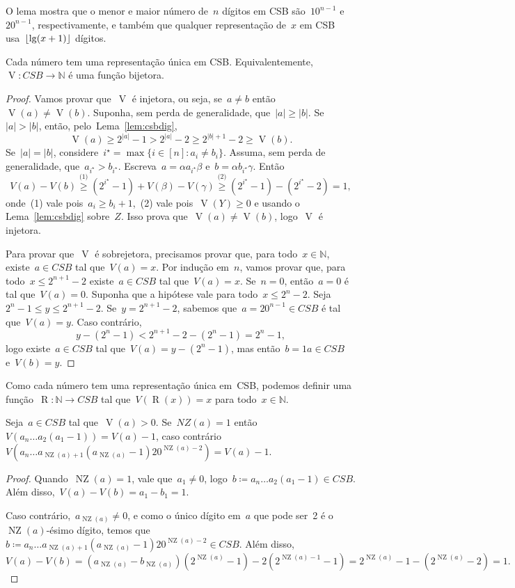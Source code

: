 \documentclass[main.tex]{subfiles}
\newcommand{\NZ}{\operatorname{NZ}}
\newcommand{\CSB}{\textit{CSB}}
\renewcommand{\V}{\operatorname{V}}
\newcommand{\R}{\operatorname{R}}
\begin{document}
O lema mostra que o menor e maior número de~$n$ dígitos em CSB são~$10^{n-1}$ e~$20^{n-1}$, respectivamente, e também que qualquer representação de~$x$ em CSB usa~$\lfloor\lg(x + 1)\rfloor$ dígitos.

\begin{theorem} \label{thm:csbbij}
	Cada número tem uma representação única em CSB. Equivalentemente,~${\V: \CSB \rightarrow \mathbb{N}}$ é uma função bijetora.
\end{theorem}
\begin{proof}
	Vamos provar que~$\V$ é injetora, ou seja, se~${a \neq b}$ então~${\V(a) \neq \V(b)}$. Suponha, sem perda de generalidade, que~$|a| \geq |b|$. Se~$|a| > |b|$, então, pelo~Lema~\ref{lem:csbdig},
	$$ \V(a) \geq 2^{|a|} - 1 > 2^{|a|} - 2 \geq 2^{|b| + 1} - 2 \geq \V(b). $$
	Se~$|a| = |b|$, considere~${i^\star = \max\{i \in [n] : a_i \neq b_i\}}$. Assuma, sem perda de generalidade, que~${a_{i^\star} > b_{i^\star}}$. Escreva~${a = \alpha a_{i^\star} \beta}$ e~${b = \alpha b_{i^\star} \gamma}$. Então
	$$ V(a) - V(b) \stackrel{\text{(1)}}{\geq} (2^{i^\star} - 1) + V(\beta) - V(\gamma) \stackrel{\text{(2)}}{\geq} (2^{i^\star} - 1) - (2^{i^\star} - 2) = 1, $$
	onde~(1) vale pois~$a_i \geq b_i + 1$,~(2) vale pois~$\V(Y) \geq 0$ e usando o Lema~\ref{lem:csbdig} sobre~$Z$. Isso prova que~$\V(a) \neq \V(b)$, logo~$\V$ é injetora.

	Para provar que~$\V$ é sobrejetora, precisamos provar que, para todo~$x \in \mathbb{N}$, existe~$a \in \CSB$ tal que~$V(a) = x$. Por indução em~$n$, vamos provar que, para todo~$x \leq 2^{n+1} - 2$ existe~$a \in \CSB$ tal que~$V(a) = x$. Se~$n = 0$, então~$a = 0$ é tal que~$V(a) = 0$. Suponha que a hipótese vale para todo~$x \leq 2^n - 2$. Seja~${2^n - 1 \leq y \leq 2^{n+1} - 2}$. Se~$y = 2^{n+1} - 2$, sabemos que~${a = 20^{n-1} \in \CSB}$ é tal que~$V(a) = y$. Caso contrário,~
	$$y - (2^n - 1) < 2^{n+1} - 2 - (2^n - 1) = 2^n - 1,$$
	logo existe~$a \in \CSB$ tal que~${V(a) = y - (2^n - 1)}$, mas então~$b = 1a \in \CSB$ e~$V(b) = y$.
\end{proof}

Como cada número tem uma representação única em~CSB, podemos definir uma função~${\R: \mathbb{N} \rightarrow \CSB}$ tal que~$V(\R(x)) = x$ para todo~$x \in \mathbb{N}$.

\begin{lemma} \label{lem:csbsub}
	Seja~$a \in \CSB$ tal que~$\V(a) > 0$. Se~$NZ(a) = 1$ então~$V(a_n \ldots a_2 (a_1-1)) = V(a) - 1$, caso contrário~${V(a_n \ldots a_{\NZ(a)+1} (a_{\NZ(a)} - 1) 2 0^{\NZ(a) - 2}) = V(a) - 1}$.
\end{lemma}
\begin{proof}
	Quando~$\NZ(a) = 1$, vale que~$a_1 \neq 0$, logo~${b \coloneqq a_n \ldots a_2 (a_1-1) \in \CSB}$. Além disso,~${V(a) - V(b) = a_1 - b_1 = 1}$.

	Caso contrário,~${a_{\NZ(a)} \neq 0}$, e como o único dígito em~$a$ que pode ser~2 é o~$\NZ(a)$-ésimo dígito, temos que~${b \coloneqq a_n \ldots a_{\NZ(a)+1} (a_{\NZ(a)} - 1) 2 0^{\NZ(a) - 2} \in \CSB}$. Além disso,
	$$ V(a) - V(b) = (a_{\NZ(a)} - b_{\NZ(a)}) (2^{\NZ(a)} - 1) - 2 (2^{\NZ(a) - 1} - 1) = 2^{\NZ(a)} - 1 - (2^{\NZ(a)} - 2) = 1. $$
\end{proof}
\end{document}
